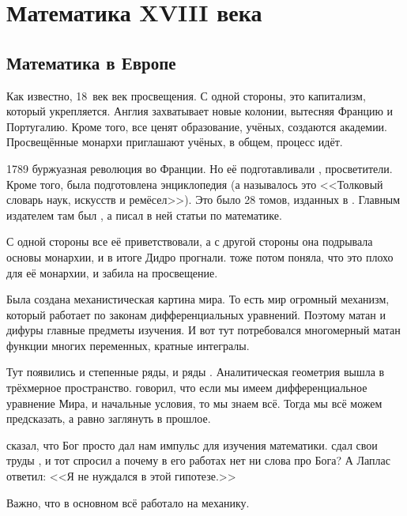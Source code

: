 \documentclass[a4paper,oneside,fleqn,10pt]{article}
\begin{document}

\section{Математика XVIII века}

\subsection{Математика в Европе}

Как известно, 18~век век просвещения. С одной стороны, это капитализм, который укрепляется.
Англия захватывает новые колонии, вытесняя Францию и Португалию. Кроме того, все ценят образование,
учёных, создаются академии. Просвещённые монархи приглашают учёных, в общем, процесс идёт.

1789 буржуазная революция во Франции. Но её подготавливали ,  просветители.
Кроме того, была подготовлена энциклопедия (а называлось это <<Толковый словарь наук, искусств и ремёсел>>).
Это было 28 томов, изданных в . Главным издателем там был , а 
писал в ней статьи по математике.

С одной стороны все её приветствовали, а с другой стороны она подрывала основы монархии, и в итоге
Дидро прогнали.  тоже потом поняла, что это плохо для её монархии, и забила на просвещение.

Была создана механистическая картина мира. То есть мир огромный механизм, который работает по законам
дифференциальных уравнений. Поэтому матан и дифуры главные предметы изучения.
И вот тут потребовался многомерный матан функции многих переменных, кратные интегралы.

Тут появились и степенные ряды, и ряды . Аналитическая геометрия вышла в трёхмерное пространство.
 говорил, что если мы имеем дифференциальное уравнение Мира, и начальные условия, то мы знаем всё.
Тогда мы всё можем предсказать, а равно заглянуть в прошлое.

 сказал, что Бог просто дал нам импульс для изучения математики.
 сдал свои труды , и тот спросил а почему в его работах нет ни слова про Бога?
А Лаплас ответил: <<Я не нуждался в этой гипотезе.>>

Важно, что в основном всё работало на механику.
\end{document}
